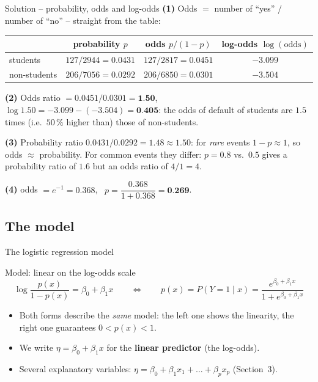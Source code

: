 \documentclass[aspectratio=169,11pt]{beamer}
\begin{document}
\begin{frame}{Solution -- probability, odds and log-odds}
  \textbf{(1)} Odds $=$ number of ``yes'' / number of ``no'' -- straight
  from the table:
  \begin{center}
    \renewcommand{\arraystretch}{1.15}
    \begin{tabular}{@{}lccc@{}}
      \toprule
      & probability $p$ & odds $p/(1-p)$ & log-odds $\log(\text{odds})$\\
      \midrule
      students & $127/2944=0.0431$ & $127/2817=0.0451$ & $-3.099$\\
      non-students & $206/7056=0.0292$ & $206/6850=0.0301$ & $-3.504$\\
      \bottomrule
    \end{tabular}
  \end{center}
  \textbf{(2)} Odds ratio $=0.0451/0.0301=\textbf{1.50}$, \ $\log1.50=-3.099-(-3.504)=\textbf{0.405}$:
  the odds of default of students are $1.5$ times (i.e.\ $50\,\%$ higher
  than) those of non-students.

  \medskip
  \textbf{(3)} Probability ratio $0.0431/0.0292=1.48\approx1.50$: for
  \emph{rare} events $1-p\approx1$, so odds $\approx$ probability. For common
  events they differ: $p=0.8$ vs.\ $0.5$ gives a probability ratio of $1.6$
  but an odds ratio of $4/1=4$.

  \medskip
  \textbf{(4)} odds $=e^{-1}=0.368$, \ $p=\dfrac{0.368}{1+0.368}=\textbf{0.269}$.
\end{frame}

\subsection{The model}

\begin{frame}{The logistic regression model}
  \begin{block}{Model: linear on the log-odds scale}
    \[
      \log\frac{p(x)}{1-p(x)}=\beta_0+\beta_1x
      \qquad\Longleftrightarrow\qquad
      p(x)=P(Y=1\mid x)=\frac{e^{\beta_0+\beta_1x}}{1+e^{\beta_0+\beta_1x}}
    \]
  \end{block}
  \begin{itemize}\setlength{\itemsep}{3pt}
    \item Both forms describe the \emph{same} model: the left one shows the
          linearity, the right one guarantees $0<p(x)<1$.
    \item We write $\eta=\beta_0+\beta_1x$ for the \textbf{linear predictor}
          (the log-odds).
    \item Several explanatory variables: $\eta=\beta_0+\beta_1x_1+\dots+\beta_px_p$
          (Section~3).
  \end{itemize}
\end{frame}
\end{document}
